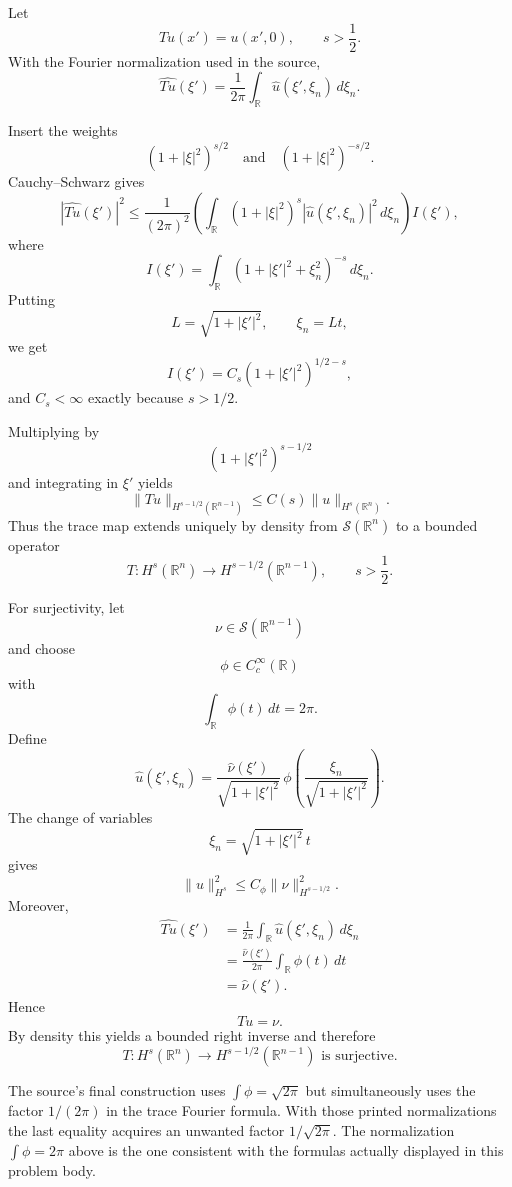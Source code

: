 \begin{solution}
Let
\[
Tu(x')=u(x',0),
\qquad
s>\frac12.
\]
With the Fourier normalization used in the source,
\[
\widehat{Tu}(\xi')
=
\frac1{2\pi}
\int_{\mathbb R}
\widehat u(\xi',\xi_n)\,d\xi_n.
\]

Insert the weights
\[
(1+|\xi|^2)^{s/2}
\quad\text{and}\quad
(1+|\xi|^2)^{-s/2}.
\]
Cauchy--Schwarz gives
\[
|\widehat{Tu}(\xi')|^2
\le
\frac1{(2\pi)^2}
\left(
\int_{\mathbb R}
(1+|\xi|^2)^s
|\widehat u(\xi',\xi_n)|^2\,d\xi_n
\right)
I(\xi'),
\]
where
\[
I(\xi')
=
\int_{\mathbb R}
(1+|\xi'|^2+\xi_n^2)^{-s}\,d\xi_n.
\]
Putting
\[
L=\sqrt{1+|\xi'|^2},
\qquad
\xi_n=Lt,
\]
we get
\[
I(\xi')
=
C_s(1+|\xi'|^2)^{1/2-s},
\]
and \(C_s<\infty\) exactly because \(s>1/2\).

Multiplying by
\[
(1+|\xi'|^2)^{s-1/2}
\]
and integrating in \(\xi'\) yields
\[
\boxed{
\|Tu\|_{H^{s-1/2}(\mathbb R^{n-1})}
\le
C(s)\|u\|_{H^s(\mathbb R^n)}.
}
\]
Thus the trace map extends uniquely by density from
\(\mathcal S(\mathbb R^n)\) to a bounded operator
\[
\boxed{
T:H^s(\mathbb R^n)
\to
H^{s-1/2}(\mathbb R^{n-1}),
\qquad s>\frac12.
}
\]

For surjectivity, let
\[
\nu\in\mathcal S(\mathbb R^{n-1})
\]
and choose
\[
\phi\in C_c^\infty(\mathbb R)
\]
with
\[
\int_{\mathbb R}\phi(t)\,dt=2\pi.
\]
Define
\[
\widehat u(\xi',\xi_n)
=
\frac{\widehat\nu(\xi')}{\sqrt{1+|\xi'|^2}}
\,
\phi\left(
\frac{\xi_n}{\sqrt{1+|\xi'|^2}}
\right).
\]
The change of variables
\[
\xi_n=\sqrt{1+|\xi'|^2}\,t
\]
gives
\[
\|u\|_{H^s}^2
\le
C_\phi
\|\nu\|_{H^{s-1/2}}^2.
\]
Moreover,
\[
\begin{aligned}
\widehat{Tu}(\xi')
&=
\frac1{2\pi}
\int_{\mathbb R}
\widehat u(\xi',\xi_n)\,d\xi_n\\
&=
\frac{\widehat\nu(\xi')}{2\pi}
\int_{\mathbb R}\phi(t)\,dt\\
&=
\widehat\nu(\xi').
\end{aligned}
\]
Hence
\[
Tu=\nu.
\]
By density this yields a bounded right inverse and therefore
\[
\boxed{
T:H^s(\mathbb R^n)\to H^{s-1/2}(\mathbb R^{n-1})
\text{ is surjective}.
}
\]

The source's final construction uses
\(\int\phi=\sqrt{2\pi}\) but simultaneously uses the factor \(1/(2\pi)\) in the trace
Fourier formula. With those printed normalizations the last equality acquires an unwanted
factor \(1/\sqrt{2\pi}\). The normalization \(\int\phi=2\pi\) above is the one consistent
with the formulas actually displayed in this problem body.
\end{solution}



